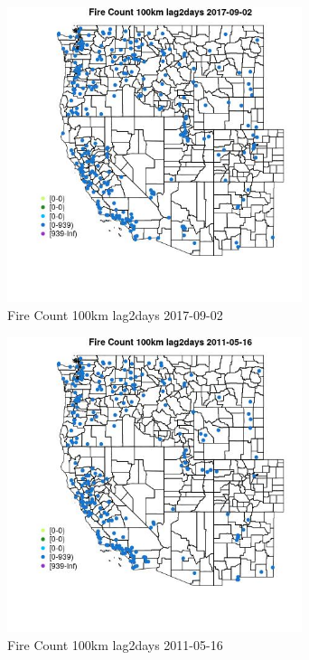 \begin{figure} 
\centering  
\includegraphics[width=0.77\textwidth]{Code_Outputs/Report_ML_input_PM25_Step4_part_e_de_duplicated_aves_compiled_2019-05-20wNAs_MapObsFire_Count_100km_lag2days2017-09-02.jpg} 
\caption{\label{fig:Report_ML_input_PM25_Step4_part_e_de_duplicated_aves_compiled_2019-05-20wNAsMapObsFire_Count_100km_lag2days2017-09-02}Fire Count 100km lag2days 2017-09-02} 
\end{figure} 
 

\clearpage 

\begin{figure} 
\centering  
\includegraphics[width=0.77\textwidth]{Code_Outputs/Report_ML_input_PM25_Step4_part_e_de_duplicated_aves_compiled_2019-05-20wNAs_MapObsFire_Count_100km_lag2days2011-05-16.jpg} 
\caption{\label{fig:Report_ML_input_PM25_Step4_part_e_de_duplicated_aves_compiled_2019-05-20wNAsMapObsFire_Count_100km_lag2days2011-05-16}Fire Count 100km lag2days 2011-05-16} 
\end{figure} 
 

